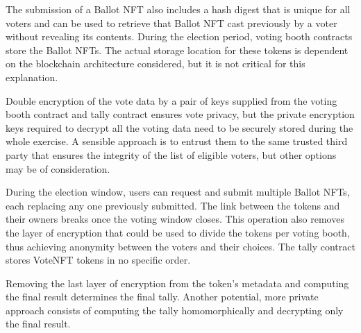\documentclass[../main.tex]{subfiles}
\begin{document}
The submission of a Ballot NFT also includes a hash digest that is unique for all voters and can be used to retrieve that Ballot NFT cast previously by a voter without revealing its contents. During the election period, voting booth contracts store the Ballot NFTs. The actual storage location for these tokens is dependent on the blockchain architecture considered, but it is not critical for this explanation.
\par
Double encryption of the vote data by a pair of keys supplied from the voting booth contract and tally contract ensures vote privacy, but the private encryption keys required to decrypt all the voting data need to be securely stored during the whole exercise. A sensible approach is to entrust them to the same trusted third party that ensures the integrity of the list of eligible voters, but other options may be of consideration.
\par
During the election window, users can request and submit multiple Ballot NFTs, each replacing any one previously submitted. The link between the tokens and their owners breaks once the voting window closes. This operation also removes the layer of encryption that could be used to divide the tokens per voting booth, thus achieving anonymity between the voters and their choices. The tally contract stores VoteNFT tokens in no specific order.
\par
Removing the last layer of encryption from the token's metadata and computing the final result determines the final tally. Another potential, more private approach consists of computing the tally homomorphically and decrypting only the final result.
\end{document}
